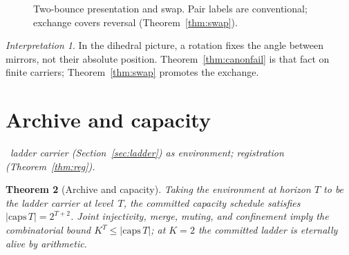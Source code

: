 \documentclass[11pt,a4paper]{article}
\theoremstyle{plain}
\newtheorem{theorem}{Theorem}[section]
\theoremstyle{definition}
\theoremstyle{remark}
\newtheorem{interpretation}[theorem]{Interpretation}
\newcommand{\comp}{\circ}
\newcommand{\dep}[1]{%
  \par\noindent{\small\color{muted}\sffamily Dependence:}~\textit{#1}\par\medskip}
\begin{document}
\Needspace{12em}
\begin{figure}[ht]
\centering
{}
\caption{Two-bounce presentation and swap. Pair labels are conventional;
exchange covers reversal (Theorem~\ref{thm:swap}).}
\label{fig:bounce}
\end{figure}

\begin{interpretation}
\label{int:mirrors}
In the dihedral picture, a rotation fixes the angle between mirrors, not
their absolute position. Theorem~\ref{thm:canonfail} is that fact on
finite carriers; Theorem~\ref{thm:swap} promotes the exchange.
\end{interpretation}


\section{Archive and capacity}
\label{sec:archive}

\dep{ladder carrier (Section~\ref{sec:ladder}) as environment;
registration (Theorem~\ref{thm:reg}).}

\begin{theorem}[Archive and capacity]
\label{thm:caps}
Taking the environment at horizon $T$ to be the ladder carrier at
level~$T$, the committed capacity schedule satisfies
$|\mathrm{caps}\,T|=2^{T+2}$. Joint injectivity, merge, muting, and
confinement imply the combinatorial bound $K^{T}\le|\mathrm{caps}\,T|$;
at $K=2$ the committed ladder is eternally alive by arithmetic.
\end{theorem}
\end{document}
